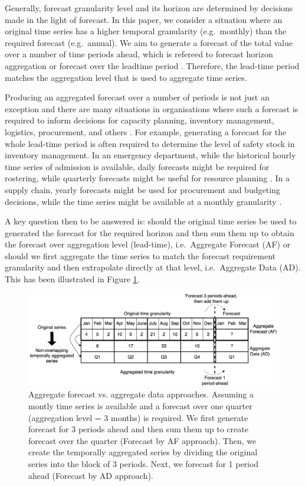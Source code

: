 \documentclass[preprint, 3p,
authoryear]{elsarticle} %
\begin{document}
Generally, forecast granularity level and its horizon are determined by
decisions made in the light of forecast. In this paper, we consider a
situation where an original time series has a higher temporal
granularity (e.g.~monthly) than the required forecast (e.g.~annual). We
aim to generate a forecast of the total value over a number of time
periods ahead, which is refereed to forecast horizon aggregation or
forecast over the leadtime period \citep{mohammadipour2012forecast}.
Therefore, the lead-time period matches the aggregation level that is
used to aggregate time series.

Producing an aggregated forecast over a number of periods is not just an
exception and there are many situations in organisations where such a
forecast is required to inform decisions for capacity planning,
inventory management, logistics, procurement, and others
\citep[\citet{zotteri2007model}]{nikolopoulos2011aggregate}. For
example, generating a forecast for the whole lead-time period is often
required to determine the level of safety stock in inventory management.
In an emergency department, while the historical hourly time series of
admission is available, daily forecasts might be required for rostering,
while quarterly forecasts might be useful for resource planning
\citep{rostami2020anticipating}. In a supply chain, yearly forecasts
might be used for procurement and budgeting decisions, while the time
series might be available at a monthly granularity
\citep{mircetic2021forecasting}.

A key question then to be answered is: should the original time series
be used to generated the forecast for the required horizon and then sum
them up to obtain the forecast over aggregation level (lead-time),
i.e.~Aggregate Forecast (AF) or should we first aggregate the time
series to match the forecast requirement granularity and then
extrapolate directly at that level, i.e.~Aggregate Data (AD). This has
been illustrated in Figure \ref{fig:example_oanoa}.

\begin{figure}[H]
\includegraphics[width=0.9\linewidth]{img/300dpi/nota} \caption{Aggregate forecast vs. aggregate data approaches. Assuming a montly time series is available and a forecast over one quarter (aggregation level = 3 months) is required. We first generate forecast for 3 periods ahead and then sum them up to create forecast over the quarter (Forecast by AF approach). Then, we create the temporally aggregated series by dividing the original series into the block of 3 periods. Next, we forecast for 1 period ahead (Forecast by AD approach).}\label{fig:example_oanoa}
\end{figure}
\end{document}
